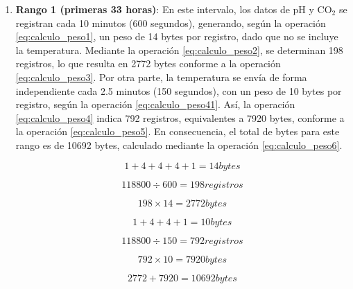 \begin{enumerate}
        \item \textbf{Rango 1 (primeras 33 horas)}: En este intervalo, los datos de pH y CO$_2$ se registran cada 10 minutos (600 segundos), generando, según la operación \ref{eq:calculo_peso1}, un peso de 14 bytes por registro, dado que no se incluye la temperatura. Mediante la operación \ref{eq:calculo_peso2}, se determinan 198 registros, lo que resulta en 2772 bytes conforme a la operación \ref{eq:calculo_peso3}. Por otra parte, la temperatura se envía de forma independiente cada 2.5 minutos (150 segundos), con un peso de 10 bytes por registro, según la operación \ref{eq:calculo_peso41}. Así, la operación \ref{eq:calculo_peso4} indica 792 registros, equivalentes a 7920 bytes, conforme a la operación \ref{eq:calculo_peso5}. En consecuencia, el total de bytes para este rango es de 10692 bytes, calculado mediante la operación \ref{eq:calculo_peso6}.

            \begin{equation}
            1 + 4 + 4 + 4 + 1 = 14 bytes
            \label{eq:calculo_peso1}
            \end{equation}

            \begin{equation}
            118800 \div 600 = 198 registros
            \label{eq:calculo_peso2}
            \end{equation}

            \begin{equation}
            198 \times 14 = 2772 bytes
            \label{eq:calculo_peso3}
            \end{equation}

            \begin{equation}
            1 + 4 + 4 + 1 = 10 bytes
            \label{eq:calculo_peso41}
            \end{equation}

            \begin{equation}
            118800 \div 150 = 792 registros
            \label{eq:calculo_peso4}
            \end{equation}

            \begin{equation}
            792 \times 10 = 7920 bytes
            \label{eq:calculo_peso5}
            \end{equation}

            \begin{equation}
            2772 + 7920 = 10692 bytes
            \label{eq:calculo_peso6}
            \end{equation}


\end{enumerate}

